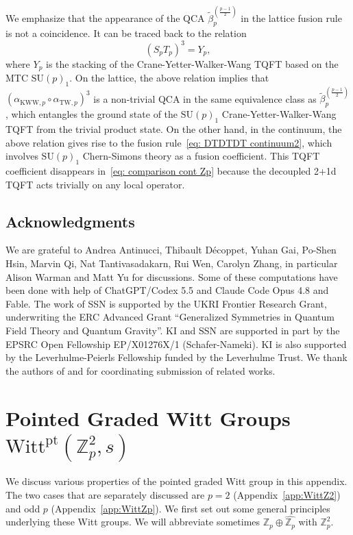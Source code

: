 \documentclass[aps,twocolumn,prx,floatfix,preprintnumbers, nofootinbib,10pt]{revtex4-2}
\makeatletter
\renewcommand{\thesection}{\arabic{section}}
\renewcommand{\thesubsection}{\thesection.\arabic{subsection}}
\renewcommand{\thesubsubsection}{\thesubsection.\arabic{subsubsection}}
\renewcommand{\p@section}{}
\renewcommand{\p@subsection}{}
\renewcommand{\p@subsubsection}{}
\let\oldappendix\appendix
\renewcommand{\appendix}{%
  \oldappendix
  \renewcommand{\thesection}{\Alph{section}}%
  \renewcommand{\thesubsection}{\thesection.\arabic{subsection}}%
  \renewcommand{\thesubsubsection}{\thesubsection.\arabic{subsubsection}}%
  \renewcommand{\p@section}{}%
  \renewcommand{\p@subsection}{}%
  \renewcommand{\p@subsubsection}{}%
  \renewcommand{\theHsection}{appendix.\Alph{section}}%
  \renewcommand{\theHsubsection}{\theHsection.\arabic{subsection}}%
  \renewcommand{\theHsubsubsection}{\theHsubsection.\arabic{subsubsection}}%
}
\numberwithin{equation}{section}
\theoremstyle{definition}
\theoremstyle{remark}
\theoremstyle{claim}
\newcommand{\aKWWp}{\alpha_{\text{KWW},p}}
\newcommand{\aTWp}{\alpha_{\text{TW},p}}
\newcommand{\Z}{{\mathbb Z}}
\newcommand{\Witt}{\text{Witt}}
\newcommand{\pt}{\text{pt}}
\makeatother
\begin{document}
We emphasize that the appearance of the QCA $\tilde{\beta}_p^{\left( \frac{p-1}{2} \right)}$ in the lattice fusion rule is not a coincidence.
It can be traced back to the relation
\begin{equation}
(S_pT_p)^3 = Y_p,
\end{equation}
where $Y_p$ is the stacking of the Crane-Yetter-Walker-Wang TQFT based on the MTC $\mathrm{SU}(p)_1$.
On the lattice, the above relation implies that $\left(\aKWWp \circ \aTWp\right)^3$ is a non-trivial QCA in the same equivalence class as $\tilde{\beta}_p^{\left(\frac{p-1}{2}\right)}$, which entangles the ground state of the $\mathrm{SU}(p)_1$ Crane-Yetter-Walker-Wang TQFT from the trivial product state.
On the other hand, in the continuum, the above relation gives rise to the fusion rule~\eqref{eq: DTDTDT continuum2}, which involves $\mathrm{SU}(p)_1$ Chern-Simons theory as a fusion coefficient.
This TQFT coefficient disappears in~\eqref{eq: comparison cont Zp} because the decoupled 2+1d TQFT acts trivially on any local operator.


\subsection*{Acknowledgments}
We are grateful to Andrea Antinucci, Thibault D\'{e}coppet, 
Yuhan Gai, Po-Shen Hsin, Marvin Qi, Nat Tantivasadakarn,  Rui Wen,
 Carolyn Zhang, in particular  Alison Warman and Matt Yu  for discussions. 
Some of these computations have been done with help of  ChatGPT/Codex 5.5 and Claude Code Opus 4.8 and Fable. 
The work of SSN is supported by the UKRI Frontier Research Grant, underwriting the ERC Advanced Grant ``Generalized Symmetries in Quantum Field Theory and Quantum Gravity''.
KI and SSN are supported in part by the EPSRC Open Fellowship EP/X01276X/1 (Schafer-Nameki).
KI is also supported by the Leverhulme-Peierls Fellowship funded by the Leverhulme Trust.
We thank the authors of \cite{Zhang:2026kjf} and \cite{Sun:2026toj} for coordinating submission of related works. 





\appendix 



\section{Pointed Graded Witt Groups $\Witt^\pt (\Z_p^2, s)$}
\label{app:Witty}

We discuss various properties of the pointed graded Witt group in this appendix. 
The two cases that are separately discussed are $p=2$ (Appendix~\ref{app:WittZ2}) and odd $p$
(Appendix~\ref{app:WittZp}). We first set out some general principles underlying these Witt groups. We will abbreviate sometimes $\Z_p\oplus \widehat{\Z_p}$ with $\Z_p^2$.
\end{document}

